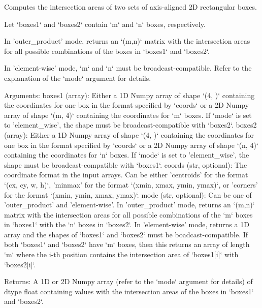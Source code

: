 \begin{DoxyVerb}Computes the intersection areas of two sets of axis-aligned 2D rectangular boxes.

Let `boxes1` and `boxes2` contain `m` and `n` boxes, respectively.

In 'outer_product' mode, returns an `(m,n)` matrix with the intersection areas for all possible
combinations of the boxes in `boxes1` and `boxes2`.

In 'element-wise' mode, `m` and `n` must be broadcast-compatible. Refer to the explanation
of the `mode` argument for details.

Arguments:
    boxes1 (array): Either a 1D Numpy array of shape `(4, )` containing the coordinates for one box in the
        format specified by `coords` or a 2D Numpy array of shape `(m, 4)` containing the coordinates for `m` boxes.
        If `mode` is set to 'element_wise', the shape must be broadcast-compatible with `boxes2`.
    boxes2 (array): Either a 1D Numpy array of shape `(4, )` containing the coordinates for one box in the
        format specified by `coords` or a 2D Numpy array of shape `(n, 4)` containing the coordinates for `n` boxes.
        If `mode` is set to 'element_wise', the shape must be broadcast-compatible with `boxes1`.
    coords (str, optional): The coordinate format in the input arrays. Can be either 'centroids' for the format
        `(cx, cy, w, h)`, 'minmax' for the format `(xmin, xmax, ymin, ymax)`, or 'corners' for the format
        `(xmin, ymin, xmax, ymax)`.
    mode (str, optional): Can be one of 'outer_product' and 'element-wise'. In 'outer_product' mode, returns an
        `(m,n)` matrix with the intersection areas for all possible combinations of the `m` boxes in `boxes1` with the
        `n` boxes in `boxes2`. In 'element-wise' mode, returns a 1D array and the shapes of `boxes1` and `boxes2`
        must be boadcast-compatible. If both `boxes1` and `boxes2` have `m` boxes, then this returns an array of
        length `m` where the i-th position contains the intersection area of `boxes1[i]` with `boxes2[i]`.

Returns:
    A 1D or 2D Numpy array (refer to the `mode` argument for details) of dtype float containing values with
    the intersection areas of the boxes in `boxes1` and `boxes2`.
\end{DoxyVerb}
 \mbox{\label{namespacekeras__utils_1_1bounding__box__utils_a61242ff96fe1b973d428544abdbfed53}} 
